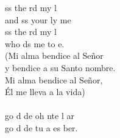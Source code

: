 \begin{cancion}%
	ss the rd my l\\
	and ss your ly me\\
	ss the rd my l\\
	who ds me to e.\\
(Mi alma bendice al Señor\\
y bendice a su Santo nombre.\\
Mi alma bendice al Señor,\\
Él me lleva a la vida)\\
\jump\\
	go d de  oh nte l ar\\
	go d de  tu a es ber.\\
\end{cancion}%
